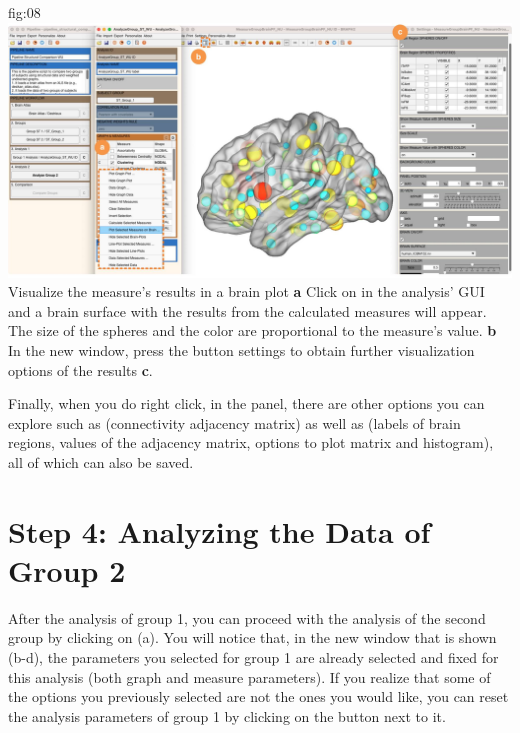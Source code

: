 \documentclass[justified]{tufte-handout}
\begin{document}
	{fig:08}
	{\includegraphics{fig08.jpg}}
	{Visualize the measure's results in a brain plot}
	{
	{\bf a} Click on  in the analysis' GUI and a brain surface with the results from the calculated measures will appear. The size of the spheres and the color are proportional to the measure's value.   
	{\bf b} In the new window, press the button settings to obtain further visualization options of the results {\bf c}. 
	}

 
 Finally, when you do right click, in the  panel, there are other options you can explore such as  (connectivity adjacency matrix) as well as  (labels of brain regions, values of the adjacency matrix, options to plot matrix and histogram), all of which can also be saved.
  
\section{Step 4: Analyzing the Data of Group 2}

After the analysis of group 1, you can proceed with the analysis of the second group by clicking on  (a). You will notice that, in the new window that is shown (b-d), the parameters you selected for group 1 are already selected and fixed for this analysis (both graph and measure parameters). If you realize that some of the options you previously selected are not the ones you would like, you can reset the analysis parameters of group 1 by clicking on the  button next to it.
\end{document}
